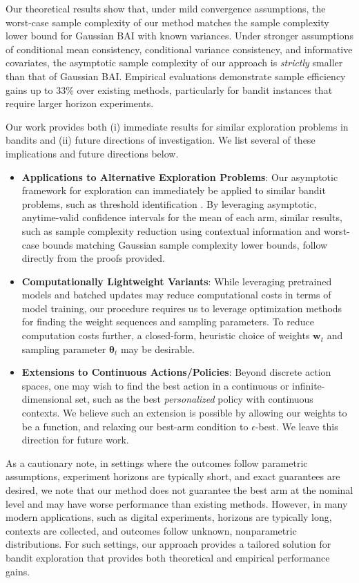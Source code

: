 \documentclass{article}
\begin{document}
Our theoretical results show that, under mild convergence assumptions, the worst-case sample complexity of our method matches the sample complexity lower bound for Gaussian BAI with known variances. Under stronger assumptions of conditional mean consistency, conditional variance consistency, and informative covariates, the asymptotic sample complexity of our approach is \textit{strictly} smaller than that of Gaussian BAI. Empirical evaluations demonstrate sample efficiency gains up to 33\% over existing methods, particularly for bandit instances that require larger horizon experiments. 

Our work provides both (i) immediate results for similar exploration problems in bandits and (ii) future directions of investigation. We list several of these implications and future directions below. 

\begin{itemize}
    \item \textbf{Applications to Alternative Exploration Problems}: Our asymptotic framework for exploration can immediately be applied to similar bandit problems, such as threshold identification \citep{cho2024rewardmaximizationpureexploration}. By leveraging asymptotic, anytime-valid confidence intervals for the mean of each arm, similar results, such as sample complexity reduction using contextual information and worst-case bounds matching Gaussian sample complexity lower bounds, follow directly from the proofs provided.
    \item \textbf{Computationally Lightweight Variants}: While leveraging pretrained models and batched updates may reduce computational costs in terms of model training, our procedure requires us to leverage optimization methods for finding the weight sequences and sampling parameters. To reduce computation costs further, a closed-form, heuristic choice of weights $\bm{w}_t$ and sampling parameter $\bm{\theta}_t$ may be desirable. 
    \item \textbf{Extensions to Continuous Actions/Policies}: Beyond discrete action spaces, one may wish to find the best action in a continuous or infinite-dimensional set, such as the best \textit{personalized} policy with continuous contexts. We believe such an extension is possible by allowing our weights to be a function, and relaxing our best-arm condition to $\epsilon$-best. We leave this direction for future work.
\end{itemize}

As a cautionary note, in settings where the outcomes follow parametric assumptions, experiment horizons are typically short, and exact guarantees are desired, we note that our method does not guarantee the best arm at the nominal level and may have worse performance than existing methods. However, in many modern applications, such as digital experiments, horizons are typically long, contexts are collected, and outcomes follow unknown, nonparametric distributions. For such settings, our approach provides a tailored solution for bandit exploration that provides both theoretical and empirical performance gains.
\end{document}

